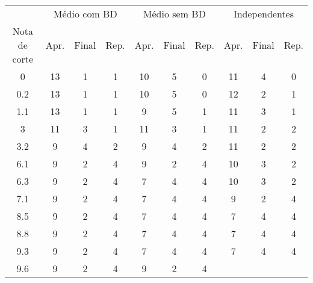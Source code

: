 \begin{tabular}{c ccc ccc ccc}
        \hline
                      & \multicolumn{3}{c}{Médio com BD}
                      & \multicolumn{3}{c}{Médio sem BD}
                      & \multicolumn{3}{c}{Independentes} \\
                      \cline{2-10}
        Nota de corte & Apr. & Final & Rep.
                      & Apr. & Final & Rep.
                      & Apr. & Final & Rep. \\
        \hline
        0    & 13 & 1 & 1    & 10 & 5 & 0    & 11 & 4 & 0 \\
        0.2  & 13 & 1 & 1    & 10 & 5 & 0    & 12 & 2 & 1 \\
        1.1  & 13 & 1 & 1    &  9 & 5 & 1    & 11 & 3 & 1 \\
        3    & 11 & 3 & 1    & 11 & 3 & 1    & 11 & 2 & 2 \\
        3.2  &  9 & 4 & 2    &  9 & 4 & 2    & 11 & 2 & 2 \\
        6.1  &  9 & 2 & 4    &  9 & 2 & 4    & 10 & 3 & 2 \\
        6.3  &  9 & 2 & 4    &  7 & 4 & 4    & 10 & 3 & 2 \\
        7.1  &  9 & 2 & 4    &  7 & 4 & 4    &  9 & 2 & 4 \\
        8.5  &  9 & 2 & 4    &  7 & 4 & 4    &  7 & 4 & 4 \\
        8.8  &  9 & 2 & 4    &  7 & 4 & 4    &  7 & 4 & 4 \\
        9.3  &  9 & 2 & 4    &  7 & 4 & 4    &  7 & 4 & 4 \\
        9.6  &  9 & 2 & 4    &  9 & 2 & 4    &    &   &   \\
        \hline
\end{tabular}
